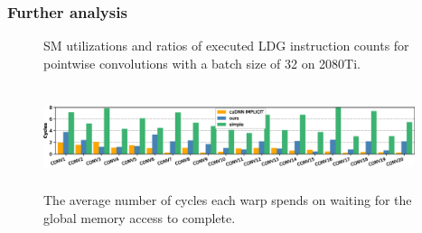 \subsubsection{Further analysis}
\begin{figure}[t!]
    \centering
    \qquad

    \vspace{-2mm}
    \caption{SM utilizations and ratios of executed LDG instruction counts for pointwise convolutions with a batch size of 32 on 2080Ti.}
    \label{fig:pwinfo}
\end{figure}

\begin{figure}[t!]
    \centering
    \includegraphics[width=0.97\textwidth,height=3cm]{figure/longscore.eps}
    \vspace{-3mm}
    \caption{The average number of cycles each warp spends on waiting for the global memory access to complete.}
    \label{fig:stalllongscore}
\end{figure}

